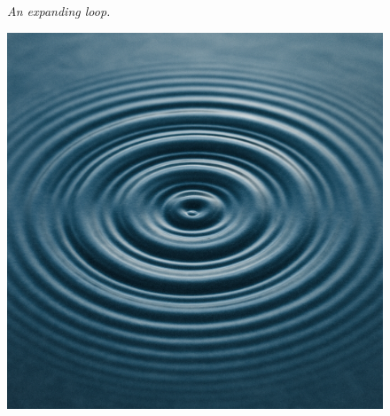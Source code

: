\documentclass[11pt]{article}
\begin{document}
\begin{figure}[ht]
    \centering
    \begin{minipage}[c]{0.25\textwidth}
        \small
        \textit{An expanding loop.}
    \end{minipage}    
    \hfill
    \begin{minipage}[c]{0.65\textwidth}
        \includegraphics[width=\linewidth]{assets/rings.png} 
    \end{minipage}
\end{figure}
\newpage
\end{document}
